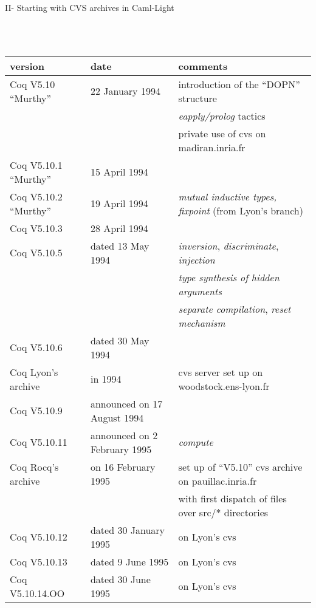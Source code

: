\documentclass[a4paper]{book}
\newcommand{\feature}[1]{{\em #1}}
\begin{document}
\centerline{II- Starting with CVS archives in Caml-Light}
\mbox{}\\
\mbox{}\\
\begin{tabular}{l|l|l}
version & date & comments \\
\hline
Coq V5.10 ``Murthy'' & 22 January 1994 &
introduction of the ``DOPN'' structure\\
 & & \feature{eapply/prolog} tactics\\
 & & private use of cvs on madiran.inria.fr\\

Coq V5.10.1 ``Murthy''& 15 April 1994 \\

Coq V5.10.2 ``Murthy''& 19 April 1994 & \feature{mutual inductive types, fixpoint} (from Lyon's branch)\\

Coq V5.10.3& 28 April 1994 \\

Coq V5.10.5& dated 13 May 1994 & \feature{inversion}, \feature{discriminate}, \feature{injection} \\
  & & \feature{type synthesis of hidden arguments}\\
  & & \feature{separate compilation}, \feature{reset mechanism} \\

Coq V5.10.6& dated 30 May 1994\\
Coq Lyon's archive & in 1994 & cvs server set up on woodstock.ens-lyon.fr\\

Coq V5.10.9& announced on 17 August 1994 &
 \\

Coq V5.10.11& announced on 2 February 1995 & \feature{compute}\\
Coq Rocq's archive & on 16 February 1995 & set up of ``V5.10'' cvs archive on pauillac.inria.fr \\
 & & with first dispatch of files over src/* directories\\

Coq V5.10.12& dated 30 January 1995 & on Lyon's cvs\\

Coq V5.10.13& dated 9 June 1995 & on Lyon's cvs\\

Coq V5.10.14.OO& dated 30 June 1995 & on Lyon's cvs\\


\end{tabular}
\end{document}
